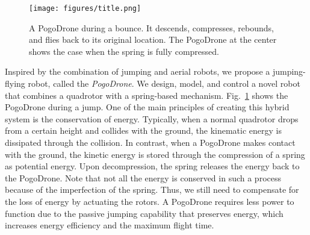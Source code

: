 \documentclass[letterpaper,10pt,conference]{ieeeconf}
\newcommand{\jiawei}[1]{{\color{purple}#1}}
\newcommand{\brian}[1]{{\color{brown}#1}}
\begin{document}
%
\begin{figure}[t!]
    \texttt{[image: figures/title.png]}
    \caption{A PogoDrone during a bounce. It descends, compresses, rebounds, and flies back to its original location. The PogoDrone at the center shows the case when the spring is fully compressed.}
    \vspace{-1em}
    \label{fig:titlePic}
\end{figure}

Inspired by the combination of jumping and aerial robots, we propose a jumping-flying robot, called the \textit{PogoDrone}. 
We design, model, and control a novel robot that combines a quadrotor with a spring-based mechanism.
Fig.~\ref{fig:titlePic} shows the PogoDrone during a jump.
One of the main principles of creating this hybrid system is the conservation of energy. Typically, when a normal quadrotor drops from a certain height and collides with the ground, the kinematic energy is dissipated through the collision. In contrast, when a PogoDrone makes contact with the ground, the kinetic energy is stored through the compression of a spring as potential energy. Upon decompression, the spring releases the energy back to the PogoDrone. Note that not all the energy is conserved in such a process because of the imperfection of the spring. Thus, we still need to compensate for the loss of energy by actuating the rotors.
A PogoDrone requires less power to function due to the passive jumping capability that preserves energy, which increases energy efficiency and the maximum flight time.
\end{document}
